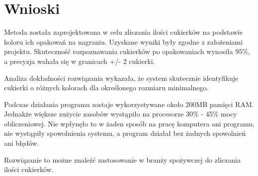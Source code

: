 \documentclass{article}
\begin{document}
\section{Wnioski}
\label{Wnioski}

Metoda została zaprojektowana w celu zliczania ilości cukierków na podstawie koloru ich opakowań na nagraniu. Uzyskane wyniki były zgodne z założeniami projektu. Skuteczność rozpoznawania cukierków po opakowaniach wynosiła 95\%, a precyzja wahała się w granicach +/- 2 cukierki.

Analiza dokładności rozwiązania wykazała, że system skutecznie identyfikuje cukierki o różnych kolorach dla określonego rozmiaru minimalnego.

Podczas działania programu zostaje wykorzystywane około 200MB pamięci RAM. Jednakże większe zużycie zasobów wystąpiło na procesorze 30\% - 45\% mocy obliczeniowej. Nie wpłynęło to w żaden sposób na pracę komputera ani programu, nie wystąpiły spowolnienia systemu, a program działał bez żadnych spowolnień ani błędów.

Rozwiązanie to możne znaleźć zastosowanie w branży spożywczej do zliczania ilości cukierków.
\end{document}
